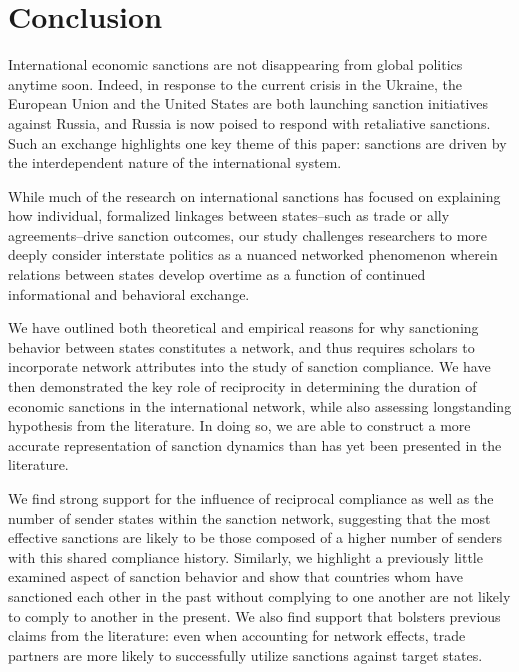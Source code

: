 \section*{Conclusion}
\label{conclusion}

International economic sanctions are not disappearing from global politics anytime soon. Indeed, in response to the current crisis in the Ukraine, the European Union and the United States are both launching sanction initiatives against Russia, and Russia is now poised to respond with retaliative sanctions. Such an exchange highlights one key theme of this paper: sanctions are driven by the interdependent nature of the international system. 

While much of the research on international sanctions has focused on explaining how individual, formalized linkages between states--such as trade or ally agreements--drive sanction outcomes, our study challenges researchers to more deeply consider interstate politics as a nuanced networked phenomenon wherein relations between states develop overtime as a function of continued informational and behavioral exchange. %

We have outlined both theoretical and empirical reasons for why sanctioning behavior between states constitutes a network, and thus requires scholars to incorporate network attributes into the study of sanction compliance. We have then demonstrated the key role of reciprocity in determining the duration of economic sanctions in the international network, while also assessing longstanding hypothesis from the literature. In doing so, we are able to construct a more accurate representation of sanction dynamics than has yet been presented in the literature. 

We find strong support for the influence of reciprocal compliance as well as the number of sender states within the sanction network, suggesting that the most effective sanctions are likely to be those composed of a higher number of senders with this shared compliance history. Similarly, we highlight a previously little examined aspect of sanction behavior and show that countries whom have sanctioned each other in the past without complying to one another are not likely to comply to another in the present. We also find support that bolsters previous claims from the literature: even when accounting for network effects, trade partners are more likely to successfully utilize sanctions against target states.  


